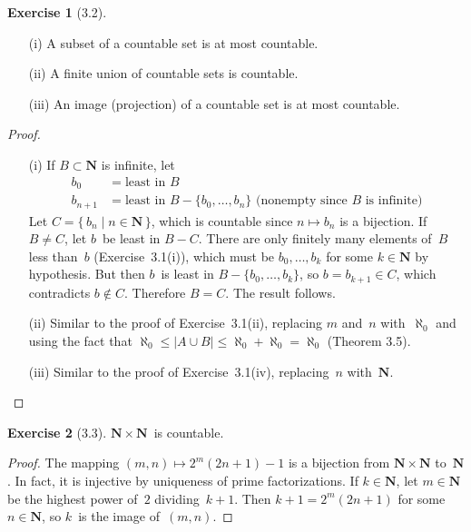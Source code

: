 \documentclass[letterpaper,12pt]{article}
\newcommand{\N}{\boldsymbol{N}}
\newcommand{\union}{\cup}
\newcommand{\card}[1]{|#1|}
\theoremstyle{definition}
\newtheorem*{exer}{Exercise}
\theoremstyle{remark}
\begin{document}
\begin{exer}[3.2]\
\begin{enumerate}[itemsep=0pt]
\item[(i)] A subset of a countable set is at most countable.
\item[(ii)] A finite union of countable sets is countable.
\item[(iii)] An image (projection) of a countable set is at most countable.
\end{enumerate}
\end{exer}
\begin{proof}\
\begin{enumerate}[itemsep=0pt]
\item[(i)] If \(B\subset\N\) is infinite, let
\begin{align*}
b_0&=\text{least in }B\\
b_{n+1}&=\text{least in }B-\{b_0,\ldots,b_n\}\text{ (nonempty since \(B\)~is infinite)}
\end{align*}
Let \(C=\{\,b_n\mid n\in\N\,\}\), which is countable since \(n\mapsto b_n\) is a bijection. If \(B\ne C\), let \(b\)~be least in \(B-C\). There are only finitely many elements of~\(B\) less than~\(b\) (Exercise~3.1(i)), which must be \(b_0,\ldots,b_k\) for some \(k\in\N\) by hypothesis. But then \(b\)~is least in \(B-\{b_0,\ldots,b_k\}\), so \(b=b_{k+1}\in C\), which contradicts \(b\not\in C\). Therefore \(B=C\). The result follows.
\item[(ii)] Similar to the proof of Exercise~3.1(ii), replacing \(m\) and~\(n\) with~\(\aleph_0\) and using the fact that \(\aleph_0\le\card{A\union B}\le\aleph_0+\aleph_0=\aleph_0\) (Theorem 3.5).
\item[(iii)] Similar to the proof of Exercise~3.1(iv), replacing~\(n\) with~\(\N\).\qedhere
\end{enumerate}
\end{proof}

\begin{exer}[3.3]
\(\N\times\N\)~is countable.
\end{exer}
\begin{proof}
The mapping \((m,n)\mapsto 2^m(2n+1)-1\) is a bijection from \(\N\times\N\) to~\(\N\). In fact, it is injective by uniqueness of prime factorizations. If \(k\in\N\), let \(m\in\N\) be the highest power of~\(2\) dividing~\(k+1\). Then \(k+1=2^m(2n+1)\) for some \(n\in\N\), so \(k\)~is the image of~\((m,n)\).
\end{proof}
\end{document}
